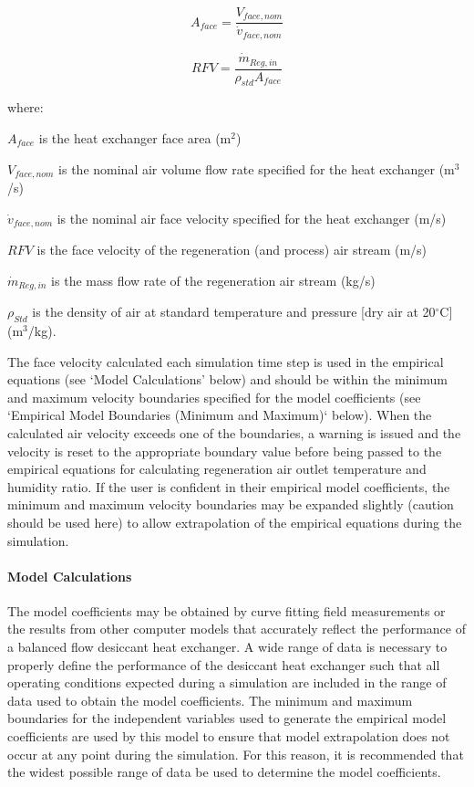 \begin{equation}
  A_{face} = \frac{V_{face,nom}}{\dot{v}_{face,nom}}
\end{equation}

\begin{equation}
  RFV = \frac{\dot{m}_{Reg,in}}{\rho_{std}A_{face}}
\end{equation}

where:

\({A_{face}}\) is the heat exchanger face area (m\(^{2}\))

\({V_{face,nom}}\) is the nominal air volume flow rate specified for the heat exchanger (m\(^{3}\)/s)

\({\dot{v}_{face,nom}}\) is the nominal air face velocity specified for the heat exchanger (m/s)

\(RFV\) is the face velocity of the regeneration (and process) air stream (m/s)

\({\dot{m}_{Reg,in}}\) is the mass flow rate of the regeneration air stream (kg/s)

\({\rho_{Std}}\) is the density of air at standard temperature and pressure {[}dry air at 20\(^{\circ}\)C{]} (m\(^{3}\)/kg).

The face velocity calculated each simulation time step is used in the empirical equations (see `Model Calculations' below) and should be within the minimum and maximum velocity boundaries specified for the model coefficients (see `Empirical Model Boundaries (Minimum and Maximum)` below). When the calculated air velocity exceeds one of the boundaries, a warning is issued and the velocity is reset to the appropriate boundary value before being passed to the empirical equations for calculating regeneration air outlet temperature and humidity ratio. If the user is confident in their empirical model coefficients, the minimum and maximum velocity boundaries may be expanded slightly (caution should be used here) to allow extrapolation of the empirical equations during the simulation.

\paragraph{Model Calculations}\label{model-calculations}

The model coefficients may be obtained by curve fitting field measurements or the results from other computer models that accurately reflect the performance of a balanced flow desiccant heat exchanger. A wide range of data is necessary to properly define the performance of the desiccant heat exchanger such that all operating conditions expected during a simulation are included in the range of data used to obtain the model coefficients. The minimum and maximum boundaries for the independent variables used to generate the empirical model coefficients are used by this model to ensure that model extrapolation does not occur at any point during the simulation. For this reason, it is recommended that the widest possible range of data be used to determine the model coefficients.

